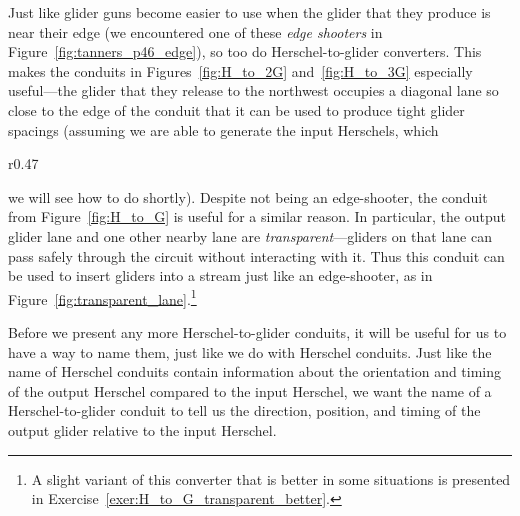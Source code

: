 Just like glider guns become easier to use when the glider that they produce is near their edge (we encountered one of these \emph{edge shooters} in Figure~\ref{fig:tanners_p46_edge}), so too do Herschel-to-glider converters. This makes the conduits in Figures~\ref{fig:H_to_2G} and~\ref{fig:H_to_3G} especially useful---the glider that they release to the northwest occupies a diagonal lane so close to the edge of the conduit that it can be used to produce tight glider spacings (assuming we are able to generate the input Herschels, which
\begin{wrapfigure}{r}{0.47\textwidth}
	\centering
	\caption{A conduit with a transparent lane inserting a glider into a period~$60$ stream.}\label{fig:transparent_lane}
\end{wrapfigure}
we will see how to do shortly). Despite not being an edge-shooter, the conduit from Figure~\ref{fig:H_to_G} is useful for a similar reason. In particular, the output glider lane and one other nearby lane are \emph{transparent}---gliders on that lane can pass safely through the circuit without interacting with it. Thus this conduit can be used to insert gliders into a stream just like an edge-shooter, as in Figure~\ref{fig:transparent_lane}.\footnote{A slight variant of this converter that is better in some situations is presented in Exercise~\ref{exer:H_to_G_transparent_better}.}

Before we present any more Herschel-to-glider conduits, it will be useful for us to have a way to name them, just like we do with Herschel conduits. Just like the name of Herschel conduits contain information about the orientation and timing of the output Herschel compared to the input Herschel, we want the name of a Herschel-to-glider conduit to tell us the direction, position, and timing of the output glider relative to the input Herschel.


